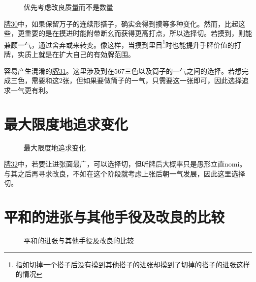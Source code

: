 \begin{figure}[h]
    \caption{优先考虑改良质量而不是数量}
    \label{lec6:pai30-31}
    \par\bigskip
\end{figure}
\hyperref[lec6:pai30-31]{牌30}中，如果保留万子的连续形搭子，确实会得到摸等多种变化。然而，比起这些，更重要的是在摸进时能附带断幺而获得更高打点，所以选择切。若摸到，则能兼顾一气，通过舍弃或来转变。像这样，当摸到里目\footnote{指如切掉一个搭子后没有摸到其他搭子的进张却摸到了切掉的搭子的进张这样的情况}时也能提升手牌价值的打牌，实质上就是在扩大自己的有効牌范围。

容易产生混淆的\hyperref[lec6:pai30-31]{牌31}。这里涉及到在567三色以及筒子的一气之间的选择。若想完成三色，需要和这2张，但如果要做筒子的一气，只需要这一张即可，因此选择追求一气更有利。

\section{最大限度地追求变化}
\begin{figure}[h]
    \caption{最大限度地追求变化}
    \label{lec6:pai32}
\end{figure}
\hyperref[lec6:pai32]{牌32}中，若要让进张面最广，可以选择切，但听牌后大概率只是愚形立直nomi。与其之后再寻求改良，不如在这个阶段就考虑上张后朝一气发展，因此这里选择切。

\section{平和的进张与其他手役及改良的比较}
\begin{figure}[h]
    \caption{平和的进张与其他手役及改良的比较}
    \label{lec6:pai33-37}
    \par\bigskip
    \par\bigskip
    \par\bigskip
    \par\bigskip
\end{figure}

